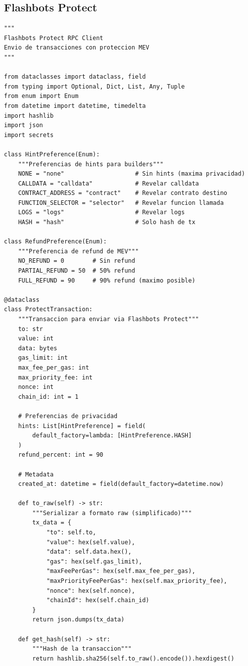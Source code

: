 \documentclass[11pt,a4paper,twoside]{book}
\theoremstyle{definition}
\theoremstyle{remark}
\begin{document}
\subsection{Flashbots Protect}

\begin{lstlisting}[style=python, caption={Cliente para Flashbots Protect RPC}]
"""
Flashbots Protect RPC Client
Envio de transacciones con proteccion MEV
"""

from dataclasses import dataclass, field
from typing import Optional, Dict, List, Any, Tuple
from enum import Enum
from datetime import datetime, timedelta
import hashlib
import json
import secrets

class HintPreference(Enum):
    """Preferencias de hints para builders"""
    NONE = "none"                    # Sin hints (maxima privacidad)
    CALLDATA = "calldata"            # Revelar calldata
    CONTRACT_ADDRESS = "contract"    # Revelar contrato destino
    FUNCTION_SELECTOR = "selector"   # Revelar funcion llamada
    LOGS = "logs"                    # Revelar logs
    HASH = "hash"                    # Solo hash de tx

class RefundPreference(Enum):
    """Preferencia de refund de MEV"""
    NO_REFUND = 0        # Sin refund
    PARTIAL_REFUND = 50  # 50% refund
    FULL_REFUND = 90     # 90% refund (maximo posible)

@dataclass
class ProtectTransaction:
    """Transaccion para enviar via Flashbots Protect"""
    to: str
    value: int
    data: bytes
    gas_limit: int
    max_fee_per_gas: int
    max_priority_fee: int
    nonce: int
    chain_id: int = 1
    
    # Preferencias de privacidad
    hints: List[HintPreference] = field(
        default_factory=lambda: [HintPreference.HASH]
    )
    refund_percent: int = 90
    
    # Metadata
    created_at: datetime = field(default_factory=datetime.now)
    
    def to_raw(self) -> str:
        """Serializar a formato raw (simplificado)"""
        tx_data = {
            "to": self.to,
            "value": hex(self.value),
            "data": self.data.hex(),
            "gas": hex(self.gas_limit),
            "maxFeePerGas": hex(self.max_fee_per_gas),
            "maxPriorityFeePerGas": hex(self.max_priority_fee),
            "nonce": hex(self.nonce),
            "chainId": hex(self.chain_id)
        }
        return json.dumps(tx_data)
    
    def get_hash(self) -> str:
        """Hash de la transaccion"""
        return hashlib.sha256(self.to_raw().encode()).hexdigest()



\end{lstlisting}
\end{document}
